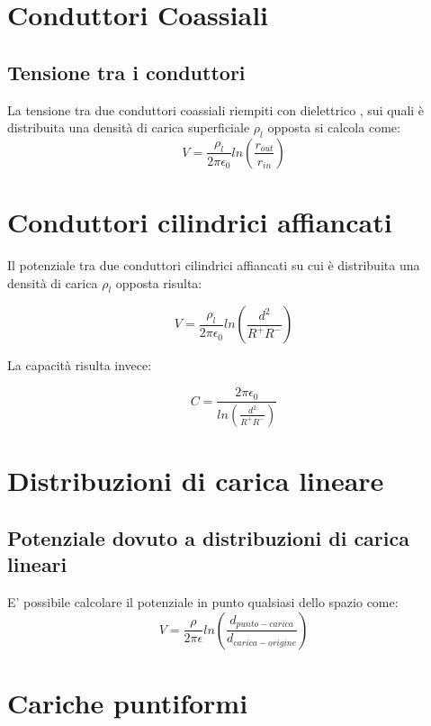 \documentclass[10pt,a4paper]{report}
\begin{document}
	\section{Conduttori Coassiali}
		\subsection{Tensione tra i conduttori}

		La tensione tra due conduttori coassiali riempiti con dielettrico , sui quali è distribuita una densità di carica superficiale $\rho_l$ opposta si calcola come:
		 \begin{equation}
		 V= \frac {\rho_l}  {2 \pi \epsilon_0} ln ( \frac { r_{out} } { r_{in} } )
		 \end{equation}
	
	\section{Conduttori cilindrici affiancati}

		Il potenziale tra due conduttori cilindrici affiancati su cui è distribuita una densità di carica $\rho_l$ opposta risulta:

		\begin{equation}
		V=\frac{\rho_l}{2 \pi \epsilon_0}{ln(\frac{d^2}{R^+R^-})}
		\label{eq:potenzialebifilari}
		\end{equation}

		La capacità risulta invece:

		\begin{equation}
		C=\frac{2 \pi \epsilon_0}{ln(\frac{d^2}{R^+R^-})}
		\end{equation}

	\section{Distribuzioni di carica lineare}

		\subsection{Potenziale dovuto a distribuzioni di carica lineari}
		E' possibile calcolare il potenziale in punto qualsiasi dello spazio come: 
		\begin{equation}
		V=\frac{\rho}{2\pi \epsilon}ln(\frac{d_{punto-carica}}{d_{carica-origine}})
		\end{equation}

	\section{Cariche puntiformi}
\end{document}
